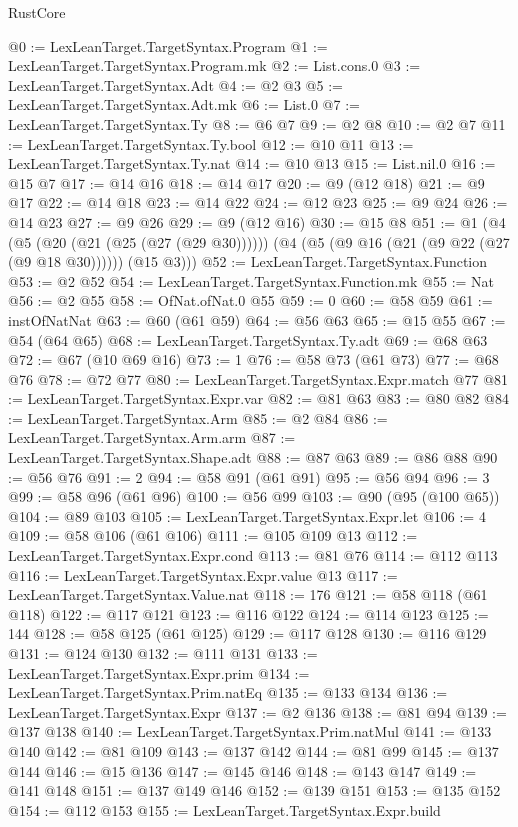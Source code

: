 \begin{lexlean}{RustCore}
\begin{coremodule}
@0 := LexLeanTarget.TargetSyntax.Program
@1 := LexLeanTarget.TargetSyntax.Program.mk
@2 := List.cons.{0}
@3 := LexLeanTarget.TargetSyntax.Adt
@4 := @2 @3
@5 := LexLeanTarget.TargetSyntax.Adt.mk
@6 := List.{0}
@7 := LexLeanTarget.TargetSyntax.Ty
@8 := @6 @7
@9 := @2 @8
@10 := @2 @7
@11 := LexLeanTarget.TargetSyntax.Ty.bool
@12 := @10 @11
@13 := LexLeanTarget.TargetSyntax.Ty.nat
@14 := @10 @13
@15 := List.nil.{0}
@16 := @15 @7
@17 := @14 @16
@18 := @14 @17
@20 := @9 (@12 @18)
@21 := @9 @17
@22 := @14 @18
@23 := @14 @22
@24 := @12 @23
@25 := @9 @24
@26 := @14 @23
@27 := @9 @26
@29 := @9 (@12 @16)
@30 := @15 @8
@51 := @1
    (@4
      (@5 (@20 (@21 (@25 (@27 (@29 @30))))))
      (@4 (@5 (@9 @16 (@21 (@9 @22 (@27 (@9 @18 @30)))))) (@15 @3)))
@52 := LexLeanTarget.TargetSyntax.Function
@53 := @2 @52
@54 := LexLeanTarget.TargetSyntax.Function.mk
@55 := Nat
@56 := @2 @55
@58 := OfNat.ofNat.{0} @55
@59 := 0
@60 := @58 @59
@61 := instOfNatNat
@63 := @60 (@61 @59)
@64 := @56 @63
@65 := @15 @55
@67 := @54 (@64 @65)
@68 := LexLeanTarget.TargetSyntax.Ty.adt
@69 := @68 @63
@72 := @67 (@10 @69 @16)
@73 := 1
@76 := @58 @73 (@61 @73)
@77 := @68 @76
@78 := @72 @77
@80 := LexLeanTarget.TargetSyntax.Expr.match @77
@81 := LexLeanTarget.TargetSyntax.Expr.var
@82 := @81 @63
@83 := @80 @82
@84 := LexLeanTarget.TargetSyntax.Arm
@85 := @2 @84
@86 := LexLeanTarget.TargetSyntax.Arm.arm
@87 := LexLeanTarget.TargetSyntax.Shape.adt
@88 := @87 @63
@89 := @86 @88
@90 := @56 @76
@91 := 2
@94 := @58 @91 (@61 @91)
@95 := @56 @94
@96 := 3
@99 := @58 @96 (@61 @96)
@100 := @56 @99
@103 := @90 (@95 (@100 @65))
@104 := @89 @103
@105 := LexLeanTarget.TargetSyntax.Expr.let
@106 := 4
@109 := @58 @106 (@61 @106)
@111 := @105 @109 @13
@112 := LexLeanTarget.TargetSyntax.Expr.cond
@113 := @81 @76
@114 := @112 @113
@116 := LexLeanTarget.TargetSyntax.Expr.value @13
@117 := LexLeanTarget.TargetSyntax.Value.nat
@118 := 176
@121 := @58 @118 (@61 @118)
@122 := @117 @121
@123 := @116 @122
@124 := @114 @123
@125 := 144
@128 := @58 @125 (@61 @125)
@129 := @117 @128
@130 := @116 @129
@131 := @124 @130
@132 := @111 @131
@133 := LexLeanTarget.TargetSyntax.Expr.prim
@134 := LexLeanTarget.TargetSyntax.Prim.natEq
@135 := @133 @134
@136 := LexLeanTarget.TargetSyntax.Expr
@137 := @2 @136
@138 := @81 @94
@139 := @137 @138
@140 := LexLeanTarget.TargetSyntax.Prim.natMul
@141 := @133 @140
@142 := @81 @109
@143 := @137 @142
@144 := @81 @99
@145 := @137 @144
@146 := @15 @136
@147 := @145 @146
@148 := @143 @147
@149 := @141 @148
@151 := @137 @149 @146
@152 := @139 @151
@153 := @135 @152
@154 := @112 @153
@155 := LexLeanTarget.TargetSyntax.Expr.build

\end{coremodule}
\end{lexlean}
